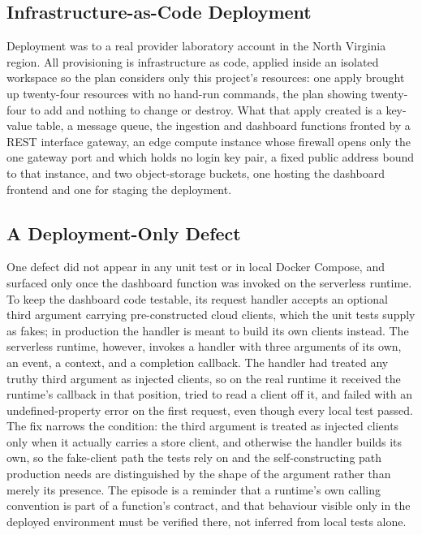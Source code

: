 \documentclass[conference]{IEEEtran}
\begin{document}
\subsection{Infrastructure-as-Code Deployment}

Deployment was to a real provider laboratory account in the North Virginia region. All provisioning is infrastructure as code, applied inside an isolated workspace so the plan considers only this project's resources: one apply brought up twenty-four resources with no hand-run commands, the plan showing twenty-four to add and nothing to change or destroy. What that apply created is a key-value table, a message queue, the ingestion and dashboard functions fronted by a REST interface gateway, an edge compute instance whose firewall opens only the one gateway port and which holds no login key pair, a fixed public address bound to that instance, and two object-storage buckets, one hosting the dashboard frontend and one for staging the deployment.

\subsection{A Deployment-Only Defect}

One defect did not appear in any unit test or in local Docker Compose, and surfaced only once the dashboard function was invoked on the serverless runtime. To keep the dashboard code testable, its request handler accepts an optional third argument carrying pre-constructed cloud clients, which the unit tests supply as fakes; in production the handler is meant to build its own clients instead. The serverless runtime, however, invokes a handler with three arguments of its own, an event, a context, and a completion callback. The handler had treated any truthy third argument as injected clients, so on the real runtime it received the runtime's callback in that position, tried to read a client off it, and failed with an undefined-property error on the first request, even though every local test passed. The fix narrows the condition: the third argument is treated as injected clients only when it actually carries a store client, and otherwise the handler builds its own, so the fake-client path the tests rely on and the self-constructing path production needs are distinguished by the shape of the argument rather than merely its presence. The episode is a reminder that a runtime's own calling convention is part of a function's contract, and that behaviour visible only in the deployed environment must be verified there, not inferred from local tests alone.
\end{document}
